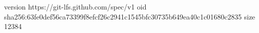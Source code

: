 version https://git-lfs.github.com/spec/v1
oid sha256:63fe0def56ca73399f8efcf26c2941c1545bfc30735b649ea40c1c01680c2835
size 12384
